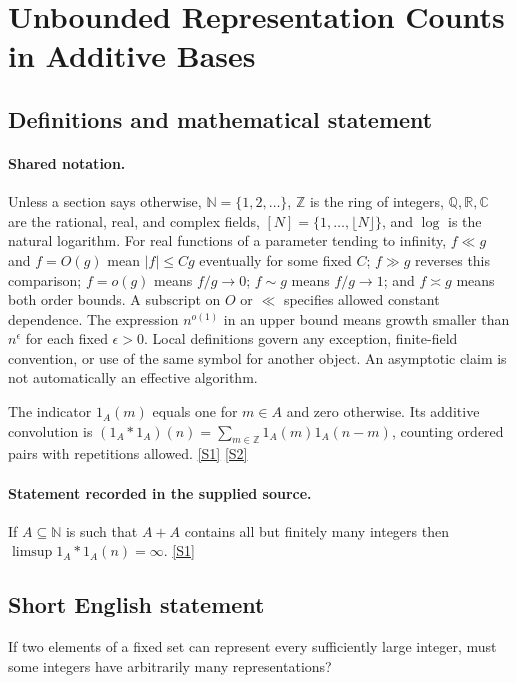 \documentclass[11pt,a4paper]{article}
\newcommand{\N}{\mathbb{N}}
\newcommand{\Z}{\mathbb{Z}}
\newcommand{\Q}{\mathbb{Q}}
\newcommand{\R}{\mathbb{R}}
\newcommand{\C}{\mathbb{C}}
\newcommand{\sref}[2]{\hyperlink{source:#1:#2}{[S#2]}}
\begin{document}
\section{Unbounded Representation Counts in Additive Bases}\label{statement}


\subsection{Definitions and mathematical statement}

\paragraph{Shared notation.}Unless a section says otherwise, $\N=\{1,2,\ldots\}$,
$\Z$ is the ring of integers, $\Q,\R,\C$ are the rational, real, and complex
fields, $[N]=\{1,\ldots,\lfloor N\rfloor\}$, and $\log$ is the natural
logarithm. For real functions of a parameter tending to infinity,
$f\ll g$ and $f=O(g)$ mean $|f|\leq Cg$ eventually for some fixed $C$;
$f\gg g$ reverses this comparison; $f=o(g)$ means $f/g\to0$;
$f\sim g$ means $f/g\to1$; and $f\asymp g$ means both order bounds.
A subscript on $O$ or $\ll$ specifies allowed constant dependence.
The expression $n^{o(1)}$ in an upper bound means growth smaller than
$n^\epsilon$ for each fixed $\epsilon>0$. Local definitions govern any
exception, finite-field convention, or use of the same symbol for another
object. An asymptotic claim is not automatically an effective algorithm.



The indicator $1_A(m)$ equals one for $m\in A$ and zero otherwise. Its additive convolution is $(1_A*1_A)(n)=\sum_{m\in\Z}1_A(m)1_A(n-m)$, counting ordered pairs with repetitions allowed. \sref{statement}{1} \sref{statement}{2}

\paragraph{Statement recorded in the supplied source.}
If $A\subseteq \mathbb{N}$ is such that $A+A$ contains all but finitely many integers then $\limsup 1_A\ast 1_A(n)=\infty$. \sref{statement}{1}

\subsection{Short English statement}

If two elements of a fixed set can represent every sufficiently large integer, must some integers have arbitrarily many representations?
\end{document}
